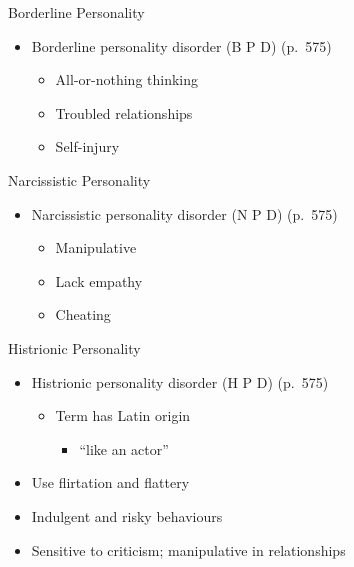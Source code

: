 \documentclass[
]{book}
\providecommand{\tightlist}{%
  \setlength{\itemsep}{0pt}\setlength{\parskip}{0pt}}
\begin{document}
\begin{reflect}
Borderline Personality

\begin{itemize}
\tightlist
\item
  Borderline personality disorder (B P D) (p.~575)

  \begin{itemize}
  \tightlist
  \item
    All-or-nothing thinking\\
  \item
    Troubled relationships\\
  \item
    Self-injury
  \end{itemize}
\end{itemize}

Narcissistic Personality

\begin{itemize}
\tightlist
\item
  Narcissistic personality disorder (N P D) (p.~575)

  \begin{itemize}
  \tightlist
  \item
    Manipulative\\
  \item
    Lack empathy\\
  \item
    Cheating
  \end{itemize}
\end{itemize}

Histrionic Personality

\begin{itemize}
\tightlist
\item
  Histrionic personality disorder (H P D) (p.~575)

  \begin{itemize}
  \tightlist
  \item
    Term has Latin origin

    \begin{itemize}
    \tightlist
    \item
      ``like an actor''\\
    \end{itemize}
  \end{itemize}
\item
  Use flirtation and flattery\\
\item
  Indulgent and risky behaviours\\
\item
  Sensitive to criticism; manipulative in relationships
\end{itemize}


\end{reflect}
\end{document}
